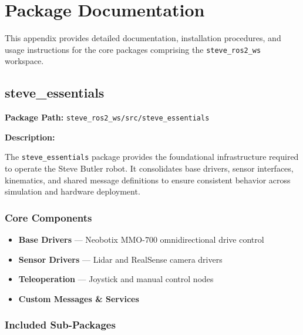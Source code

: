 \documentclass[12pt,oneside,a4paper]{article}
\begin{document}

\clearpage
\appendix

\section{Package Documentation}
\label{sec:package_documentation}

This appendix provides detailed documentation, installation procedures, and usage instructions for the core packages comprising the \texttt{steve\_ros2\_ws} workspace.

\subsection{steve\_essentials}
\label{subsec:steve_essentials}

\textbf{Package Path:} \texttt{steve\_ros2\_ws/src/steve\_essentials}

\textbf{Description:}

The \texttt{steve\_essentials} package provides the foundational infrastructure required to operate the Steve Butler robot. It consolidates base drivers, sensor interfaces, kinematics, and shared message definitions to ensure consistent behavior across simulation and hardware deployment.

\subsubsection{Core Components}

\begin{itemize}
    \item \textbf{Base Drivers} — Neobotix MMO-700 omnidirectional drive control
    \item \textbf{Sensor Drivers} — Lidar and RealSense camera drivers
    \item \textbf{Teleoperation} — Joystick and manual control nodes
    \item \textbf{Custom Messages \& Services}
\end{itemize}

\subsubsection{Included Sub-Packages}
\end{document}
